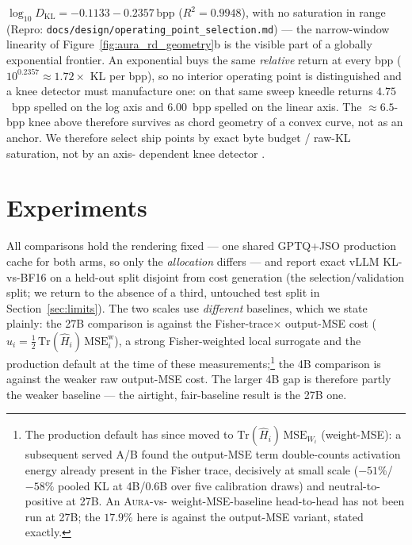 \documentclass[11pt]{article}
\theoremstyle{plain}
\theoremstyle{definition}
\newcommand{\bpp}{\mathrm{bpp}}
\newcommand{\kl}{D_{\mathrm{KL}}}
\begin{document}
$\log_{10}\kl=-0.1133-0.2357\,\bpp$ ($R^2=0.9948$), with no saturation in range
(Repro: \texttt{docs/design/operating\_point\_selection.md}) --- the narrow-window
linearity of Figure~\ref{fig:aura_rd_geometry}b is the visible part of a globally
exponential frontier. An exponential buys the same \emph{relative} return at every
bpp ($10^{0.2357}\!\approx\!1.72\times$ KL per bpp), so no interior operating point
is distinguished and a knee detector must manufacture one: on that same sweep
kneedle returns $4.75$~bpp spelled on the log axis and $6.00$~bpp spelled on the
linear axis. The $\approx6.5$-bpp knee above therefore survives as chord geometry
of a convex curve, not as an anchor. We therefore
select ship points by exact byte budget / raw-KL saturation, not by an axis-%
dependent knee detector \cite{kneedle2011}.



\section{Experiments}\label{sec:experiments}

All comparisons hold the rendering fixed --- one shared GPTQ+JSO production cache
for both arms, so only the \emph{allocation} differs --- and report exact vLLM
KL-vs-BF16 on a held-out split disjoint from cost generation (the
selection/validation split; we return to the absence of a third, untouched test
split in Section~\ref{sec:limits}). The two scales use \emph{different} baselines,
which we state plainly: the 27B comparison is against the Fisher-trace$\times$%
output-MSE cost
($u_i=\tfrac12\,\mathrm{Tr}(\hat H_i)\,\mathrm{MSE}^{\mathrm w}_i$), a strong
Fisher-weighted local surrogate and the production default at the time of these
measurements;\footnote{The production default has since moved to
$\mathrm{Tr}(\hat H_i)\,\mathrm{MSE}_{W_i}$ (weight-MSE): a subsequent served A/B
found the output-MSE term double-counts activation energy already present in the
Fisher trace, decisively at small scale ($-51\%$/$-58\%$ pooled KL at 4B/0.6B over
five calibration draws) and neutral-to-positive at 27B. An \textsc{Aura}-vs-%
weight-MSE-baseline head-to-head has not been run at 27B; the $17.9\%$ here is
against the output-MSE variant, stated exactly.} the 4B comparison is against the
weaker raw output-MSE cost. The larger 4B gap is therefore partly the weaker
baseline --- the airtight, fair-baseline result is the 27B one.
\end{document}
